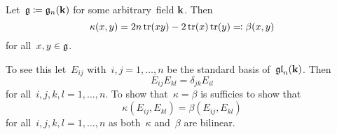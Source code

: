 \begin{example}
  \label{killing form of gl_n}
  Let~$\mathfrak{g} \coloneqq \mathfrak{g}_n(\mathbf{k})$ for some arbitrary~field $\mathbf{k}$.
  Then
  \[
    \kappa(x,y)
    =
    2n\operatorname{tr}(xy) - 2\operatorname{tr}(x)\operatorname{tr}(y)
    \eqqcolon
    \beta(x,y)
  \]
  for all~$x, y \in \mathfrak{g}$.
  
  To see this let~$E_{ij}$ with~$i,j = 1, \dotsc, n$ be the standard basis of~$\mathfrak{gl}_n(\mathbf{k})$.
  Then
  \begin{equation}
    \label{product of elementary matrices}
    E_{ij} E_{kl}
    =
    \delta_{jk} E_{il}
  \end{equation}
  for all~$i,j,k,l = 1, \dotsc, n$.
  To show that~$\kappa = \beta$ is sufficies to show that
  \[
    \kappa(E_{ij}, E_{kl})
    =
    \beta(E_{ij}, E_{kl})
  \]
  for all~$i,j,k,l = 1, \dotsc, n$ as both~$\kappa$ and~$\beta$ are bilinear.
  

\end{example}
